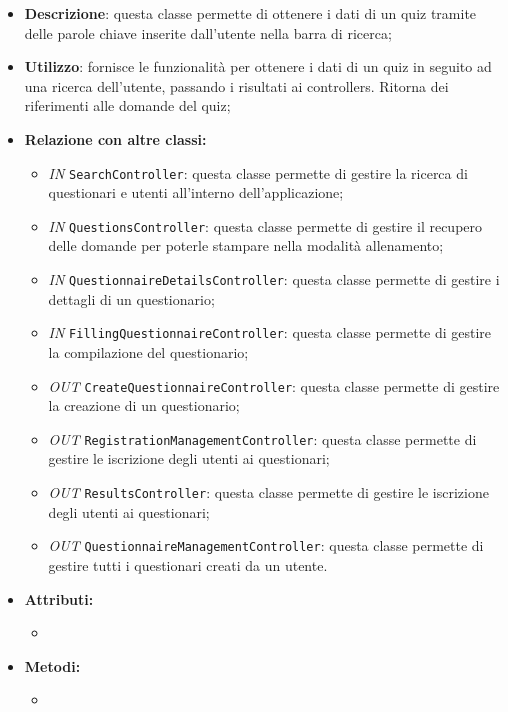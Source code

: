 \begin{itemize}
	\item \textbf{Descrizione}: questa classe permette di ottenere i dati di un quiz tramite delle parole chiave inserite dall'utente nella barra di ricerca;
	\item \textbf{Utilizzo}: fornisce le funzionalità per ottenere i dati di un quiz in seguito ad una ricerca dell'utente, passando i risultati ai controllers. Ritorna dei riferimenti alle domande del quiz;
	\item \textbf{Relazione con altre classi:}
	\begin{itemize}
		\item \textit{IN} \texttt{SearchController}: questa classe permette di gestire la ricerca di questionari e utenti all'interno dell'applicazione;
		\item \textit{IN} \texttt{QuestionsController}: questa classe permette di gestire il recupero delle domande per poterle stampare nella modalità allenamento;
		\item \textit{IN} \texttt{QuestionnaireDetailsController}: questa classe permette di gestire i dettagli di un questionario;
		\item \textit{IN} \texttt{FillingQuestionnaireController}: questa classe permette di gestire la compilazione del questionario;
		\item \textit{OUT} \texttt{CreateQuestionnaireController}: questa classe permette di gestire la creazione di un questionario;
		\item \textit{OUT} \texttt{RegistrationManagementController}: questa classe permette di gestire le iscrizione degli utenti ai questionari;
		\item \textit{OUT} \texttt{ResultsController}: questa classe permette di gestire le iscrizione degli utenti ai questionari; 
		\item \textit{OUT} \texttt{QuestionnaireManagementController}: questa classe permette di gestire tutti i questionari creati da un utente. 
		
	\end{itemize}
	\item \textbf{Attributi:}
	\begin{itemize}
		\item 
	\end{itemize}
	\item \textbf{Metodi:}
	\begin{itemize}
		\item 
	\end{itemize}
\end{itemize}

